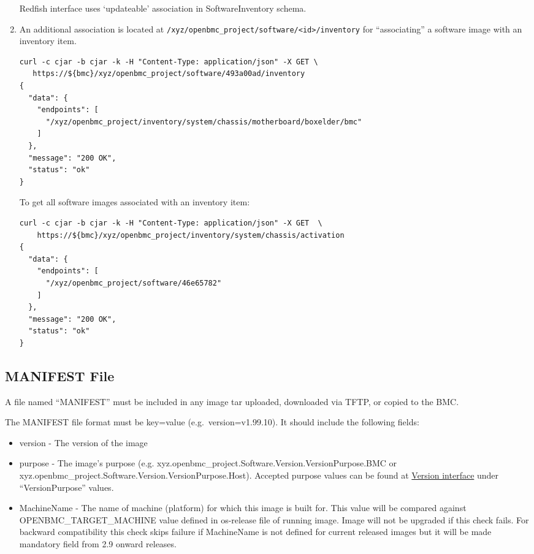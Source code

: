 \begin{enumerate}
  Redfish interface uses `updateable' association in SoftwareInventory
  schema.
\item
  An additional association is located at
  \texttt{/xyz/openbmc\_project/software/\textless{}id\textgreater{}/inventory}
  for ``associating'' a software image with an inventory item.

\begin{verbatim}
curl -c cjar -b cjar -k -H "Content-Type: application/json" -X GET \
   https://${bmc}/xyz/openbmc_project/software/493a00ad/inventory
{
  "data": {
    "endpoints": [
      "/xyz/openbmc_project/inventory/system/chassis/motherboard/boxelder/bmc"
    ]
  },
  "message": "200 OK",
  "status": "ok"
}
\end{verbatim}

  To get all software images associated with an inventory item:

\begin{verbatim}
curl -c cjar -b cjar -k -H "Content-Type: application/json" -X GET  \
    https://${bmc}/xyz/openbmc_project/inventory/system/chassis/activation
{
  "data": {
    "endpoints": [
      "/xyz/openbmc_project/software/46e65782"
    ]
  },
  "message": "200 OK",
  "status": "ok"
}
\end{verbatim}
\end{enumerate}

\hypertarget{manifest-file}{%
\subsection{MANIFEST File}\label{manifest-file}}

A file named ``MANIFEST'' must be included in any image tar uploaded,
downloaded via TFTP, or copied to the BMC.

The MANIFEST file format must be key=value (e.g.~version=v1.99.10). It
should include the following fields:

\begin{itemize}
\tightlist
\item
  version - The version of the image
\item
  purpose - The image's purpose (e.g.
  xyz.openbmc\_project.Software.Version.VersionPurpose.BMC or
  xyz.openbmc\_project.Software.Version.VersionPurpose.Host). Accepted
  purpose values can be found at
  \href{https://github.com/openbmc/phosphor-dbus-interfaces/blob/6f69ae5b33ee224358cb4c2061f4ad44c6b36d70/xyz/openbmc_project/Software/Version.interface.yaml}{Version
  interface} under ``VersionPurpose'' values.
\item
  MachineName - The name of machine (platform) for which this image is
  built for. This value will be compared against
  OPENBMC\_TARGET\_MACHINE value defined in os-release file of running
  image. Image will not be upgraded if this check fails. For backward
  compatibility this check skips failure if MachineName is not defined
  for current released images but it will be made mandatory field from
  2.9 onward releases.
\end{itemize}

